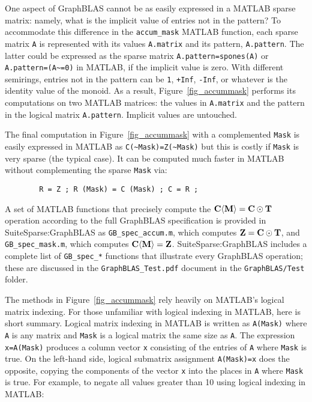 \documentclass[12pt]{article}
\begin{document}
One aspect of GraphBLAS cannot be as easily expressed in a MATLAB sparse
matrix: namely, what is the implicit value of entries not in the pattern?  To
accommodate this difference in the \verb'accum_mask' MATLAB function, each
sparse matrix \verb'A' is represented with its values \verb'A.matrix' and its
pattern, \verb'A.pattern'.  The latter could be expressed as the sparse matrix
\verb'A.pattern=spones(A)' or \verb'A.pattern=(A~=0)' in MATLAB, if the
implicit value is zero.  With different semirings, entries not in the pattern
can be \verb'1', \verb'+Inf', \verb'-Inf', or whatever is the identity value of
the monoid.  As a result, Figure~\ref{fig_accummask} performs its computations
on two MATLAB matrices: the values in \verb'A.matrix' and the pattern in the
logical matrix \verb'A.pattern'.  Implicit values are untouched.

The final computation in Figure~\ref{fig_accummask}  with a complemented
\verb'Mask' is easily expressed in MATLAB as \verb'C(~Mask)=Z(~Mask)' but this
is costly if \verb'Mask' is very sparse (the typical case).  It can be computed
much faster in MATLAB without complementing the sparse \verb'Mask' via:

        {\footnotesize
        \begin{verbatim}
        R = Z ; R (Mask) = C (Mask) ; C = R ; \end{verbatim} }

A set of MATLAB functions that precisely compute the ${\bf C \langle M \rangle
= C \odot T}$ operation according to the full GraphBLAS specification is
provided in SuiteSparse:GraphBLAS as \verb'GB_spec_accum.m', which computes
${\bf Z=C\odot T}$, and \verb'GB_spec_mask.m', which computes ${\bf C \langle M
\rangle = Z}$.  SuiteSparse:GraphBLAS includes a complete list of
\verb'GB_spec_*' functions that illustrate every GraphBLAS operation;
these are discussed in the \verb'GraphBLAS_Test.pdf' document in
the \verb'GraphBLAS/Test' folder.

The methods in Figure~\ref{fig_accummask} rely heavily on MATLAB's logical
matrix indexing.  For those unfamiliar with logical indexing in MATLAB, here is
short summary.  Logical matrix indexing in MATLAB is written as \verb'A(Mask)'
where \verb'A' is any matrix and \verb'Mask' is a logical matrix the same size
as \verb'A'.  The expression \verb'x=A(Mask)' produces a column vector \verb'x'
consisting of the entries of \verb'A' where \verb'Mask' is true.  On the
left-hand side, logical submatrix assignment \verb'A(Mask)=x' does the
opposite, copying the components of the vector \verb'x' into the places in
\verb'A' where \verb'Mask' is true.  For example, to negate all values greater
than 10 using logical indexing in MATLAB:
\end{document}

